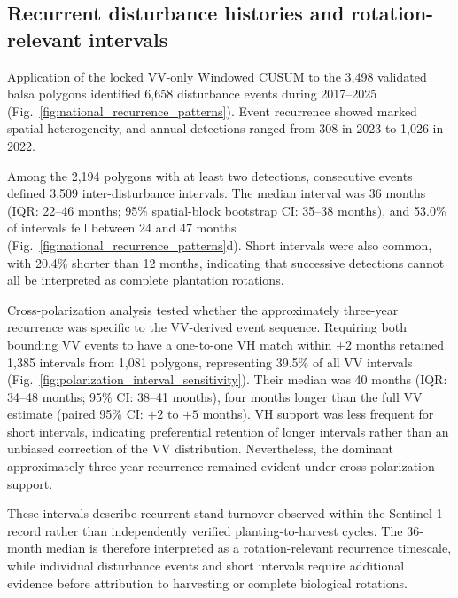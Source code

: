 \subsection{Recurrent disturbance histories and rotation-relevant intervals}
\label{sec:rotation_dynamics}

Application of the locked VV-only Windowed CUSUM to the 3,498 validated balsa polygons identified 6,658 disturbance events during 2017--2025 (Fig.~\ref{fig:national_recurrence_patterns}). Event recurrence showed marked spatial heterogeneity, and annual detections ranged from 308 in 2023 to 1,026 in 2022. 

Among the 2,194 polygons with at least two detections, consecutive events defined 3,509 inter-disturbance intervals. The median interval was 36 months (IQR: 22--46 months; 95\% spatial-block bootstrap CI: 35--38 months), and 53.0\% of intervals fell between 24 and 47 months (Fig.~\ref{fig:national_recurrence_patterns}d). Short intervals were also common, with 20.4\% shorter than 12 months, indicating that successive detections cannot all be interpreted as complete plantation rotations.

Cross-polarization analysis tested whether the approximately three-year recurrence was specific to the VV-derived event sequence. Requiring both bounding VV events to have a one-to-one VH match within $\pm2$ months retained 1,385 intervals from 1,081 polygons, representing 39.5\% of all VV intervals (Fig.~\ref{fig:polarization_interval_sensitivity}). Their median was 40 months (IQR: 34--48 months; 95\% CI: 38--41 months), four months longer than the full VV estimate (paired 95\% CI: $+2$ to $+5$ months). VH support was less frequent for short intervals, indicating preferential retention of longer intervals rather than an unbiased correction of the VV distribution. Nevertheless, the dominant approximately three-year recurrence remained evident under cross-polarization support.

These intervals describe recurrent stand turnover observed within the Sentinel-1 record rather than independently verified planting-to-harvest cycles. The 36-month median is therefore interpreted as a rotation-relevant recurrence timescale, while individual disturbance events and short intervals require additional evidence before attribution to harvesting or complete biological rotations.

